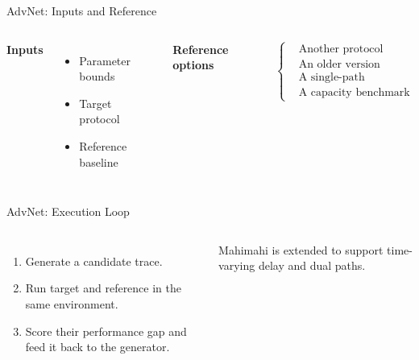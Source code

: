 \begin{frame}[t]{AdvNet: Inputs and Reference}
\vspace{24pt}
\begin{columns}[c,onlytextwidth]
\column{250pt}
\compactfont
{\color{SemBlue}\textbf{Inputs}}\par
\begin{itemize}\setlength{\itemsep}{7pt}
\item Parameter bounds
\item Target protocol
\item Reference baseline
\end{itemize}
\vspace{22pt}
{\color{SemBlue}\textbf{Reference options}}\par
\vspace{12pt}
{
$\left\{\begin{aligned}
&\text{Another protocol}\\
&\text{An older version}\\
&\text{A single-path configuration}\\
&\text{A capacity benchmark}
\end{aligned}\right.$\par}
\column{620pt}
\end{columns}
\end{frame}

\begin{frame}[t]{AdvNet: Execution Loop}
\vspace{24pt}
\begin{columns}[c,onlytextwidth]
\column{250pt}
\compactfont
\begin{enumerate}\setlength{\itemsep}{16pt}
\item Generate a candidate trace.
\item Run target and reference in the same environment.
\item Score their performance gap and feed it back to the generator.
\end{enumerate}
\vspace{20pt}
{\fontsize{18}{23}\selectfont\color{SemGray}
Mahimahi is extended to support time-varying delay and dual paths.\par}
\column{620pt}
\end{columns}
\end{frame}

